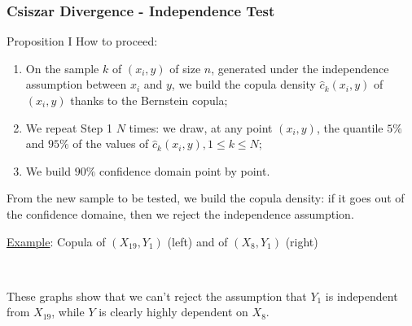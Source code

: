\documentclass[8pt]{beamer}
\begin{document}
\begin{frame}
  \frametitle{Csiszar Divergence - Independence Test}
  \small
  
  \begin{block}{Proposition I}
   How to proceed: 
   \begin{enumerate}
    \item On the sample $k$ of $(x_i, y)$ of size $n$, generated under the independence assumption between $x_i$ and $y$, we build the copula density $\hat{c}_k(x_i,y)$  of $(x_i,y)$ thanks to the Bernstein copula;
    \item We repeat Step 1  $N$ times: we draw, at any point $(x_i,y)$, the quantile $5\%$ and $95\%$ of the values of $\hat{c}_k(x_i,y), 1\leq k \leq N$;
    \item We build \alert{$90\%$ confidence domain} point by point.
   \end{enumerate}
From the new sample to be tested, we build the copula density: if it goes out of the confidence domaine, then we reject the independence assumption.
  \end{block}

 \underline{Example}: Copula of $(X_{19}, Y_1)$ (left) and of $(X_8, Y_1)$ (right)
\begin{center}
    \, 
  \end{center}
  These graphs show that we can't reject the assumption that $Y_1$ is independent from $X_{19}$, while $Y$ is clearly highly dependent on $X_8$.
  \end{frame}
  
\end{document}
